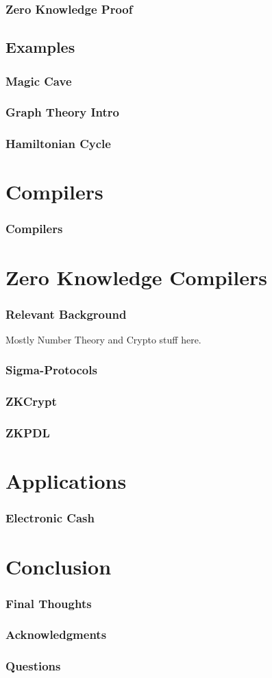 \documentclass{beamer}
\begin{document}
\begin{frame}
	\frametitle{Zero Knowledge Proof}
\end{frame}

\subsection{Examples}

\begin{frame}
	\frametitle{Magic Cave}
\end{frame}

\begin{frame}
	\frametitle{Graph Theory Intro}
\end{frame}

\begin{frame}
	\frametitle{Hamiltonian Cycle}
\end{frame}

\section{Compilers}

\begin{frame}
	\frametitle{Compilers}
\end{frame}

\section{Zero Knowledge Compilers}

\begin{frame}
	\frametitle{Relevant Background}
	Mostly Number Theory and Crypto stuff here.
\end{frame}

\begin{frame}
	\frametitle{Sigma-Protocols}
\end{frame}

\begin{frame}
	\frametitle{ZKCrypt}
\end{frame}

\begin{frame}
	\frametitle{ZKPDL}
\end{frame}

\section{Applications}

\begin{frame}
	\frametitle{Electronic Cash}
\end{frame}

\section{Conclusion}

\begin{frame}
	\frametitle{Final Thoughts}
\end{frame}

\begin{frame}
	\frametitle{Acknowledgments}
\end{frame}

\begin{frame}
	\frametitle{Questions}
\end{frame}
\end{document}
